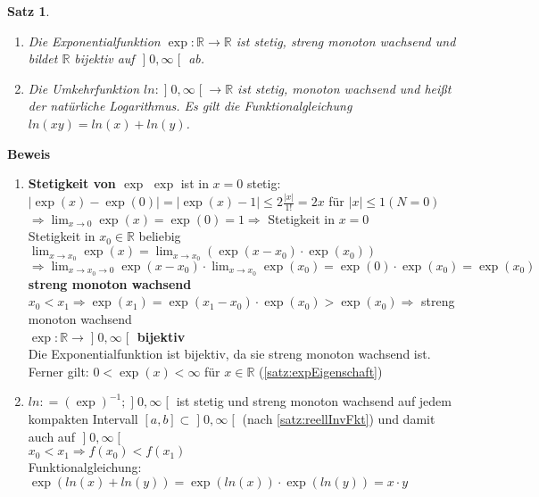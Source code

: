 \documentclass[ngerman,titlepage,twoside, parskip=half*]{scrreprt}
\newcommand*{\R}{\mathbb{R}}
\theoremstyle{plain}
\newtheorem{theorem}{Satz}[section]
\theoremstyle{definition}
\theoremstyle{remark}
\newcommand*{\abs}[2][]{#1\lvert#2#1\rvert}
\newcommand*{\coloneqq}{\mathrel{\mathop:}=}
\newcommand*{\bsofint}[1]{\mathopen{]}#1\mathclose{[}} %
\begin{document}
\begin{theorem}
\begin{enumerate}[i]
  \item Die Exponentialfunktion $\exp\colon \R\rightarrow\R$ ist stetig, streng monoton wach\-send und bildet $\R$ bijektiv auf
    $\bsofint{0,\infty}$ ab.
  \item Die Umkehrfunktion $ln\colon\bsofint{0,\infty}\rightarrow\R$ ist stetig, monoton wachsend und heißt der \emph{natürliche
    Logarithmus}. Es gilt die Funktionalgleichung $ln(xy)=ln(x)+ln(y)$.
\end{enumerate}
\end{theorem}

\textbf{Beweis}
\begin{enumerate}[zu i]
  \item \textbf{Stetigkeit von $\exp$} $\exp$ ist in $x=0$ stetig:\\
    $\abs{\exp(x)-\exp(0)}=\abs{\exp(x)-1}\leq 2\frac{\abs{x}}{1!}=2x$ für $\abs{x}\leq 1 (N=0)$\\
    $\Rightarrow \lim_{x\rightarrow 0}\exp(x)=\exp(0)=1\Rightarrow$ Stetigkeit in $x=0$\\
    Stetigkeit in $x_0\in \R$ beliebig\\
    $\lim_{x\rightarrow x_0} \exp(x)=\lim_{x\rightarrow x_0} (\exp(x-x_0)\cdot \exp(x_0))$\\
    $\Rightarrow \lim_{x\rightarrow x_0\rightarrow 0} \exp(x-x_0)\cdot \lim_{x\rightarrow x_0} \exp(x_0)=\exp(0)\cdot \exp(x_0)
    =\exp(x_0)$\\
    \textbf{streng monoton wachsend}\\
    $x_0<x_1 \Rightarrow \exp(x_1)=\exp(x_1-x_0)\cdot \exp(x_0)>\exp(x_0)\Rightarrow$ streng monoton wachsend\\
    \textbf{$\exp\colon\R\rightarrow \bsofint{0,\infty}$ bijektiv}\\
    Die Exponentialfunktion ist bijektiv, da sie streng monoton wachsend ist. Ferner gilt: $0<\exp(x)<\infty$ für $x\in\R$
    (\autoref{satz:expEigenschaft})
  \item $ln\coloneqq(\exp)^{-1}; \bsofint{0,\infty}$ ist stetig und streng monoton wachsend auf jedem kompakten Intervall $[a,b]\subset \bsofint{0,
    \infty}$ (nach \autoref{satz:reellInvFkt})
    und damit auch auf $\bsofint{0,\infty}$\\
    $x_0<x_1 \Rightarrow f(x_0)<f(x_1)$\\
    Funktionalgleichung:\\
    $\exp(ln (x)+ln(y))=\exp(ln(x))\cdot \exp(ln(y))=x\cdot y$
\end{enumerate}
\end{document}
